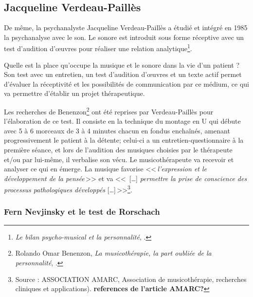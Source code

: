 \subsection{Jacqueline Verdeau-Paillès}

 De même, la psychanalyste Jacqueline Verdeau-Paillès a étudié
 et
intégré en 1985 la psychanalyse avec le son.  Le sonore est  introduit
sous forme réceptive avec un test d'audition d'\oe uvres pour réaliser
une relation analytique\footnote{\textsl{Le bilan psycho-musical et la
    personnalité}, \cite{verdeau-pailles:bilan}.}.

Quelle est la place qu'occupe la musique et le sonore dans la vie d'un patient ? Son test avec un entretien, un test d'audition d'\oe uvres et un texte actif permet d'évaluer la réceptivité et les possibilités de communication par ce médium, ce qui va permettre d'établir un projet thérapeutique.

Les recherches de Benenzon\footnote{Rolando Omar
  Benenzon, \textsl{La musicothérapie, la part oubliée de la
    personnalité}, \cite{benenzon:musicotherapie}.} ont été reprises par
Verdeau-Paillès pour l'élaboration de ce test. Il consiste en la technique du montage en U qui débute avec 5 à 6 morceaux de 3 à 4 minutes chacun en fondus enchaînés, amenant progressivement le patient à la détente; celui-ci a un entretien-questionnaire à la première
séance, et lors de l'audition des musiques choisies par le thérapeute
et/ou par lui-même, il  verbalise son vécu. Le musicothérapeute
va recevoir et analyser ce qui en émerge. 
La musique favorise  <<\,\emph{l'expression et le développement
	de la pensée}\,>> et  va <<\, [\ldots] \emph{permettre la prise de conscience des processus pathologiques développés} [\ldots]\,>>\footnote{Source : ASSOCIATION AMARC,
  Association de musicothérapie, recherches cliniques et
  applications). \textbf{references de l'article AMARC?}}.


 \subsubsection{Fern Nevjinsky et le test de Rorschach}
 
